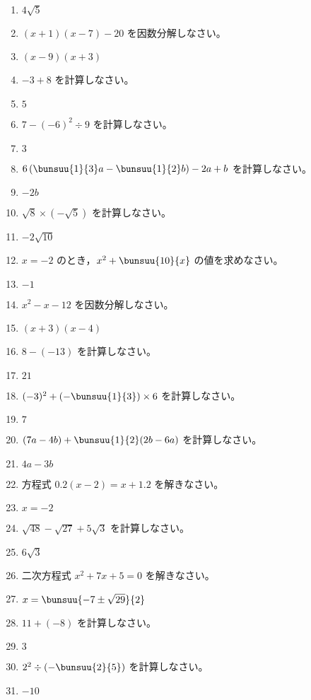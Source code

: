\documentclass[uplatex,a4j,11pt]{jsreport}
\begin{document}
\begin{multicols}{2}
\begin{enumerate}
    \item $4\sqrt{5}$
    \item $(x+1)(x-7)-20$ を因数分解しなさい。%
    \item $(x-9)(x+3)$
    \item $-3+8$ を計算しなさい。%
    \item $5$
    \item $7-(-6)^2\div9$ を計算しなさい。%
    \item $3$
    \item $6\left(\bunsuu{1}{3}a-\bunsuu{1}{2}b\right)-2a+b$ を計算しなさい。%
    \item $-2b$
    \item $\sqrt{8}\times(-\sqrt{5})$ を計算しなさい。%
    \item $-2\sqrt{10}$
    \item $x=-2$ のとき，$x^2+\bunsuu{10}{x}$ の値を求めなさい。%
    \item $-1$
    \item $x^2-x-12$ を因数分解しなさい。%
    \item $(x+3)(x-4)$
    \item $8-(-13)$ を計算しなさい。%
    \item $21$
    \item $(-3)^2+\left(-\bunsuu{1}{3}\right)\times6$ を計算しなさい。%
    \item $7$
    \item $(7a-4b)+\bunsuu{1}{2}(2b-6a)$ を計算しなさい。%
    \item $4a-3b$
    \item 方程式 $0.2(x-2)=x+1.2$ を解きなさい。%
    \item $x = -2$
    \item $\sqrt{48}-\sqrt{27}+5\sqrt{3}$ を計算しなさい。%
    \item $6\sqrt{3}$
    \item 二次方程式 $x^2+7x+5=0$ を解きなさい。%
    \item $x=\bunsuu{-7\pm\sqrt{29}}{2}$
    \item $11+(-8)$ を計算しなさい。%
    \item $3$
    \item $2^2\div\left(-\bunsuu{2}{5}\right)$ を計算しなさい。%
    \item $-10$

\end{enumerate}
\end{multicols}
\end{document}
